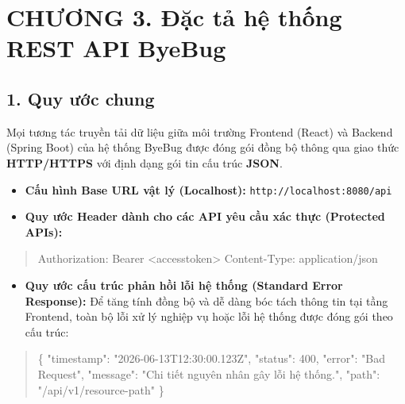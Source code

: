 \documentclass[12pt,a4paper]{article}
\renewcommand{\_}{\BreakableUnderscore}
\newenvironment{Shaded}{\vspace{3pt}\begin{quote}}{\end{quote}\vspace{3pt}}
\newcommand{\DataTypeTok}[1]{\textcolor[rgb]{0.56,0.13,0.00}{#1}}
\newcommand{\DecValTok}[1]{\textcolor[rgb]{0.25,0.63,0.44}{#1}}
\newcommand{\FunctionTok}[1]{\textcolor[rgb]{0.02,0.16,0.49}{#1}}
\newcommand{\NormalTok}[1]{#1}
\newcommand{\StringTok}[1]{\textcolor[rgb]{0.25,0.44,0.63}{#1}}
\providecommand{\tightlist}{%
  \setlength{\itemsep}{0pt}\setlength{\parskip}{0pt}}
\begin{document}
\newpage

\section{CHƯƠNG 3. Đặc tả hệ thống REST API ByeBug}

\subsection{1. Quy ước chung}

Mọi tương tác truyền tải dữ liệu giữa môi trường Frontend (React) và Backend (Spring Boot) của hệ thống ByeBug được đóng gói đồng bộ thông qua giao thức \textbf{HTTP/HTTPS} với định dạng gói tin cấu trúc \textbf{JSON}.

\begin{itemize}
\tightlist
\item
  \textbf{Cấu hình Base URL vật lý (Localhost):} \texttt{http://localhost:8080/api}
\item
  \textbf{Quy ước Header dành cho các API yêu cầu xác thực (Protected APIs):}
\end{itemize}

\begin{Shaded}
\begin{Highlighting}[]
\NormalTok{Authorization: Bearer \textless{}access\_token\textgreater{}}
\NormalTok{Content{-}Type: application/json}
\end{Highlighting}
\end{Shaded}

\begin{itemize}
\tightlist
\item
  \textbf{Quy ước cấu trúc phản hồi lỗi hệ thống (Standard Error Response):} Để tăng tính đồng bộ và dễ dàng bóc tách thông tin tại tầng Frontend, toàn bộ lỗi xử lý nghiệp vụ hoặc lỗi hệ thống được đóng gói theo cấu trúc:
\end{itemize}

\begin{Shaded}
\begin{Highlighting}[]
\FunctionTok{\{}
  \DataTypeTok{"timestamp"}\FunctionTok{:} \StringTok{"2026{-}06{-}13T12:30:00.123Z"}\FunctionTok{,}
  \DataTypeTok{"status"}\FunctionTok{:} \DecValTok{400}\FunctionTok{,}
  \DataTypeTok{"error"}\FunctionTok{:} \StringTok{"Bad Request"}\FunctionTok{,}
  \DataTypeTok{"message"}\FunctionTok{:} \StringTok{"Chi tiết nguyên nhân gây lỗi hệ thống."}\FunctionTok{,}
  \DataTypeTok{"path"}\FunctionTok{:} \StringTok{"/api/v1/resource{-}path"}
\FunctionTok{\}}
\end{Highlighting}
\end{Shaded}
\end{document}
